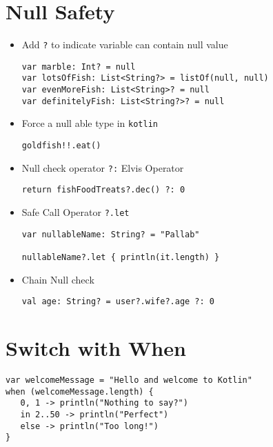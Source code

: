 \documentclass[11pt]{article}
\begin{document}
\section*{Null Safety}
\label{sec:orgf271448}
\begin{itemize}
\item Add \texttt{?} to indicate variable can contain null value
\begin{verbatim}
var marble: Int? = null
var lotsOfFish: List<String?> = listOf(null, null)
var evenMoreFish: List<String>? = null
var definitelyFish: List<String?>? = null
\end{verbatim}
\item Force a null able type in \texttt{kotlin}
\begin{verbatim}
goldfish!!.eat()
\end{verbatim}
\item Null check operator \texttt{?:} Elvis Operator
\begin{verbatim}
return fishFoodTreats?.dec() ?: 0
\end{verbatim}
\item Safe Call Operator \texttt{?.let}
\begin{verbatim}
var nullableName: String? = "Pallab"

nullableName?.let { println(it.length) }
\end{verbatim}
\item Chain Null check
\begin{verbatim}
val age: String? = user?.wife?.age ?: 0
\end{verbatim}
\end{itemize}
\section*{Switch with When}
\label{sec:org5b632ed}
\begin{verbatim}
var welcomeMessage = "Hello and welcome to Kotlin"
when (welcomeMessage.length) {
   0, 1 -> println("Nothing to say?")
   in 2..50 -> println("Perfect")
   else -> println("Too long!")
}
\end{verbatim}
\end{document}
